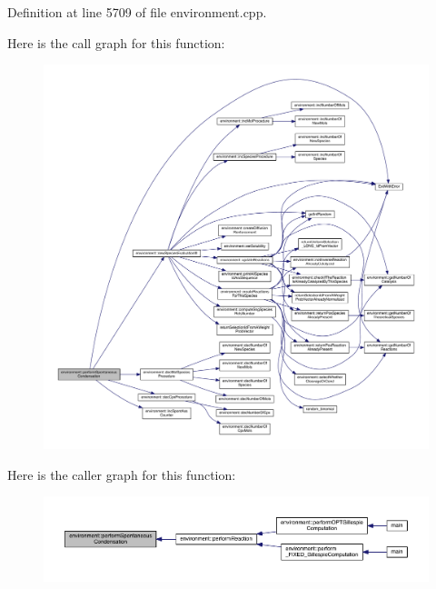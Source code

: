Definition at line 5709 of file environment.\+cpp.



Here is the call graph for this function\+:\nopagebreak
\begin{figure}[H]
\begin{center}
\leavevmode
\includegraphics[width=350pt]{a00013_acc764a05297ae00db52360f3df5ed1d5_cgraph}
\end{center}
\end{figure}




Here is the caller graph for this function\+:\nopagebreak
\begin{figure}[H]
\begin{center}
\leavevmode
\includegraphics[width=350pt]{a00013_acc764a05297ae00db52360f3df5ed1d5_icgraph}
\end{center}
\end{figure}


